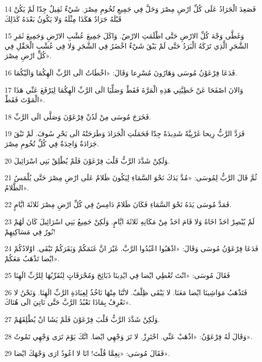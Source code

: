 \par 14 فَصَعِدَ الْجَرَادُ عَلَى كُلِّ ارْضِ مِصْرَ وَحَلَّ فِي جَمِيعِ تُخُومِ مِصْرَ. شَيْءٌ ثَقِيلٌ جِدّا لَمْ يَكُنْ قَبْلَهُ جَرَادٌ هَكَذَا مِثْلَهُ وَلا يَكُونُ بَعْدَهُ كَذَلِكَ
\par 15 وَغَطَّى وَجْهَ كُلِّ الارْضِ حَتَّى اظْلَمَتِ الارْضُ. وَاكَلَ جَمِيعَ عُشْبِ الارْضِ وَجَمِيعَ ثَمَرِ الشَّجَرِ الَّذِي تَرَكَهُ الْبَرَدُ حَتَّى لَمْ يَبْقَ شَيْءٌ اخْضَرُ فِي الشَّجَرِ وَلا فِي عُشْبِ الْحَقْلِ فِي كُلِّ ارْضِ مِصْرَ».
\par 16 فَدَعَا فِرْعَوْنُ مُوسَى وَهَارُونَ مُسْرِعا وَقَالَ: «اخْطَاتُ الَى الرَّبِّ الَهِكُمَا وَالَيْكُمَا.
\par 17 وَالانَ اصْفَحَا عَنْ خَطِيَّتِي هَذِهِ الْمَرَّةَ فَقَطْ وَصَلِّيَا الَى الرَّبِّ الَهِكُمَا لِيَرْفَعَ عَنِّي هَذَا الْمَوْتَ فَقَطْ».
\par 18 فَخَرَجَ مُوسَى مِنْ لَدُنْ فِرْعَوْنَ وَصَلَّى الَى الرَّبِّ.
\par 19 فَرَدَّ الرَّبُّ رِيحا غَرْبِيَّةً شَدِيدَةً جِدّا فَحَمَلَتِ الْجَرَادَ وَطَرَحَتْهُ الَى بَحْرِ سُوفَ. لَمْ تَبْقَ جَرَادَةٌ وَاحِدَةٌ فِي كُلِّ تُخُومِ مِصْرَ.
\par 20 وَلَكِنْ شَدَّدَ الرَّبُّ قَلْبَ فِرْعَوْنَ فَلَمْ يُطْلِقْ بَنِي اسْرَائِيلَ.
\par 21 ثُمَّ قَالَ الرَّبُّ لِمُوسَى: «مُدَّ يَدَكَ نَحْوَ السَّمَاءِ لِيَكُونَ ظَلامٌ عَلَى ارْضِ مِصْرَ حَتَّى يُلْمَسُ الظَّلامُ».
\par 22 فَمَدَّ مُوسَى يَدَهُ نَحْوَ السَّمَاءِ فَكَانَ ظَلامٌ دَامِسٌ فِي كُلِّ ارْضِ مِصْرَ ثَلاثَةَ ايَّامٍ.
\par 23 لَمْ يُبْصِرْ احَدٌ اخَاهُ وَلا قَامَ احَدٌ مِنْ مَكَانِهِ ثَلاثَةَ ايَّامٍ. وَلَكِنْ جَمِيعُ بَنِي اسْرَائِيلَ كَانَ لَهُمْ نُورٌ فِي مَسَاكِنِهِمْ!
\par 24 فَدَعَا فِرْعَوْنُ مُوسَى وَقَالَ: «اذْهَبُوا اعْبُدُوا الرَّبَّ. غَيْرَ انَّ غَنَمَكُمْ وَبَقَرَكُمْ تَبْقَى. اوْلادُكُمْ ايْضا تَذْهَبُ مَعَكُمْ».
\par 25 فَقَالَ مُوسَى: «انْتَ تُعْطِي ايْضا فِي ايْدِينَا ذَبَائِحَ وَمُحْرَقَاتٍ لِنُقَرِّبُهَا لِلرَّبِّ الَهِنَا
\par 26 فَتَذْهَبُ مَوَاشِينَا ايْضا مَعَنَا. لا يَبْقَى ظِلْفٌ. لانَّنَا مِنْهَا نَاخُذُ لِعِبَادَةِ الرَّبِّ الَهِنَا. وَنَحْنُ لا نَعْرِفُ بِمَاذَا نَعْبُدُ الرَّبَّ حَتَّى نَاتِيَ الَى هُنَاكَ».
\par 27 وَلَكِنْ شَدَّدَ الرَّبُّ قَلْبَ فِرْعَوْنَ فَلَمْ يَشَا انْ يُطْلِقَهُمْ.
\par 28 وَقَالَ لَهُ فِرْعَوْنُ: «اذْهَبْ عَنِّي. احْتَرِزْ. لا تَرَ وَجْهِي ايْضا. انَّكَ يَوْمَ تَرَى وَجْهِي تَمُوتُ».
\par 29 فَقَالَ مُوسَى: «نِعِمَّا قُلْتَ! انَا لا اعُودُ ارَى وَجْهَكَ ايْضا».

